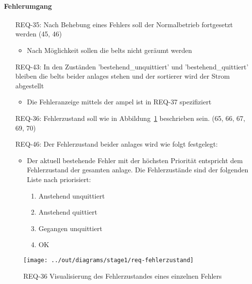 \paragraph{Fehlerumgang}
\begin{itemize}
    \item[REQ-35:] Nach Behebung eines Fehlers soll der Normalbetrieb fortgesetzt werden (45, 46)
    \begin{itemize}
        \item Nach Möglichkeit sollen die \glspl{belt} nicht geräumt werden
    \end{itemize}
    \item[REQ-43:] In den Zuständen 'bestehend\_unquittiert' und 'bestehend\_quittiert' bleiben die
    \glspl{belt} beider \glspl{anlage} stehen und der \gls{sortierer} wird der Strom abgestellt
    \begin{itemize}
        \item Die Fehleranzeige mittels der \gls{ampel} ist in REQ-37 spezifiziert
    \end{itemize}
    \item[REQ-36:] Fehlerzustand soll wie in Abbildung~\ref{fig:stm-fehlerzustand} beschrieben sein. (65, 66, 67, 69, 70)
    \item[REQ-46:] Der Fehlerzustand beider \glspl{anlage} wird wie folgt festgelegt:
    \begin{itemize}
        \item Der aktuell bestehende Fehler mit der höchsten Priorität entspricht dem Fehlerzustand der gesamten \gls{anlage}.
        Die Fehlerzustände sind der folgenden Liste nach priorisiert:
    \begin{enumerate} %
        \item Anstehend unquittiert
        \item Anstehend quittiert
        \item Gegangen unquittiert
        \item OK
    \end{enumerate}
    \end{itemize}
\end{itemize}

\begin{figure}[h]
    \centering
    \texttt{[image: ../out/diagrams/stage1/req-fehlerzustand]}
    \caption{REQ-36 Visualisierung des Fehlerzustandes eines einzelnen Fehlers}
    \label{fig:stm-fehlerzustand}
\end{figure}
